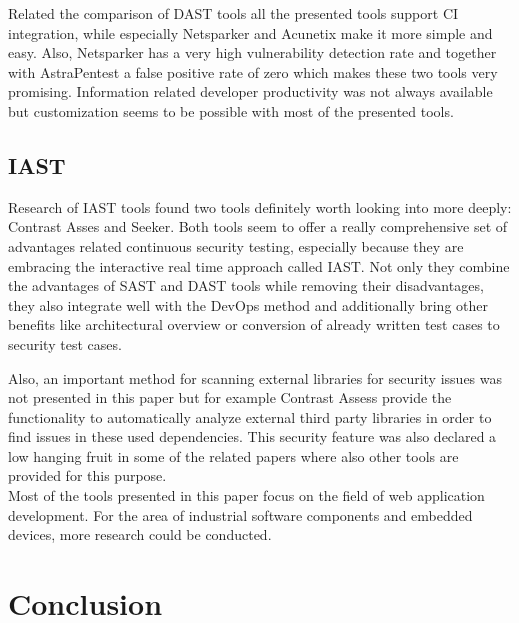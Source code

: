 \documentclass[conference]{IEEEtran}
\begin{document}
Related the comparison of DAST tools all the presented tools support CI integration, while especially Netsparker and Acunetix make it more simple and easy. Also, Netsparker has a very high vulnerability detection rate and together with AstraPentest a false positive rate of zero which makes these two tools very promising. Information related developer productivity was not always available but customization seems to be possible with most of the presented tools.

\subsection{IAST}

Research of IAST tools found two tools definitely worth looking into more deeply: Contrast Asses and Seeker. Both tools  seem to offer a really comprehensive set of advantages related continuous security testing, especially because they are embracing the interactive real time approach called IAST. Not only they combine the advantages of SAST and DAST tools while removing their disadvantages, they also integrate well with the DevOps method and additionally bring other benefits like architectural overview or conversion of already written test cases to security test cases. 

Also, an important method for scanning external libraries for security issues was not presented in this paper but for example Contrast Assess provide the functionality to automatically analyze external third party libraries in order to find issues in these used dependencies. This security feature was also declared a low hanging fruit in some of the related papers where also other tools are provided for this purpose.\\

Most of the tools presented in this paper focus on the field of web application development. For the area of industrial software components and embedded devices, more research could be conducted.



\section{Conclusion}
\end{document}

